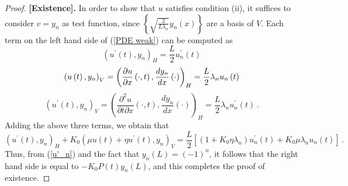 \documentclass[12pt,a4paper]{amsart}
\theoremstyle{definition}
\begin{document}
\begin{proof}
\textbf{[Existence].} In order to show that $u$ satisfies condition (ii), it
suffices to consider $v=y_{n}$ as test function, since $\left\{ \sqrt{\frac{2%
}{L\lambda _{n}}}y_{n}\left( x\right) \right\} $ are a basis of $V$. Each
term on the left hand side of (\ref{PDE weak}) can be computed as
\begin{equation*}
\left( u^{\prime }\left( t\right) ,y_{n}\right) _{H}=\frac{L}{2}%
u_{n}^{\prime }\left( t\right)
\end{equation*}%
\begin{equation*}
\left( u\left( t\right) ,y_{n}\right) _{V}=\left( \dfrac{\partial u}{%
\partial x}\left( \cdot ,t\right) ,\dfrac{dy_{n}}{dx}\left( \cdot \right)
\right) _{H}=\frac{L}{2}\lambda _{n}u_{n}\left( t\right)
\end{equation*}%
\begin{equation*}
\left( u^{\prime }\left( t\right) ,y_{n}\right) _{V}=\left( \dfrac{\partial
^{2}u}{\partial t\partial x}\left( \cdot ,t\right) ,\dfrac{dy_{n}}{dx}\left(
\cdot \right) \right) _{H}=\frac{L}{2}\lambda _{n}u_{n}^{\prime }\left(
t\right) \,.
\end{equation*}%
Adding the above three terms, we obtain that%
\begin{equation*}
\left( u^{\prime }\left( t\right) ,y_{n}\right) _{H}+K_{0}\left( \mu u\left(
t\right) +\eta u^{\prime }\left( t\right) ,y_{n}\right) _{V}=\frac{L}{2}%
\left[ \left( 1+K_{0}\eta \lambda _{n}\right) u_{n}^{\prime }\left( t\right)
+K_{0}\mu \lambda _{n}u_{n}\left( t\right) \right]\,.
\end{equation*}%
Thus, from (\ref{u'_n}) and the fact that
$y_{n}\left( L\right) =\left( -1\right) ^{n}$, it follows that
the right hand side is equal to $-K_{0}P\left( t\right) y_{n}\left( L\right)
$, and this completes the proof of existence.


\end{proof}
\end{document}
